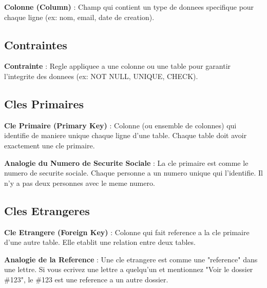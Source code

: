 \documentclass[a4paper,12pt]{book}
\begin{document}
\begin{definitionbox}
    \textbf{Colonne (Column)} : Champ qui contient un type de donnees specifique pour chaque ligne (ex: nom, email, date de creation).
\end{definitionbox}

\subsection{Contraintes}

\begin{definitionbox}
    \textbf{Contrainte} : Regle appliquee a une colonne ou une table pour garantir l'integrite des donnees (ex: NOT NULL, UNIQUE, CHECK).
\end{definitionbox}

\subsection{Cles Primaires}

\begin{definitionbox}
    \textbf{Cle Primaire (Primary Key)} : Colonne (ou ensemble de colonnes) qui identifie de maniere unique chaque ligne d'une table. Chaque table doit avoir exactement une cle primaire.
\end{definitionbox}

\begin{analogybox}
    \textbf{Analogie du Numero de Securite Sociale} : La cle primaire est comme le numero de securite sociale. Chaque personne a un numero unique qui l'identifie. Il n'y a pas deux personnes avec le meme numero.
\end{analogybox}

\subsection{Cles Etrangeres}

\begin{definitionbox}
    \textbf{Cle Etrangere (Foreign Key)} : Colonne qui fait reference a la cle primaire d'une autre table. Elle etablit une relation entre deux tables.
\end{definitionbox}

\begin{analogybox}
    \textbf{Analogie de la Reference} : Une cle etrangere est comme une "reference" dans une lettre. Si vous ecrivez une lettre a quelqu'un et mentionnez "Voir le dossier \#123", le \#123 est une reference a un autre dossier.
\end{analogybox}
\end{document}
